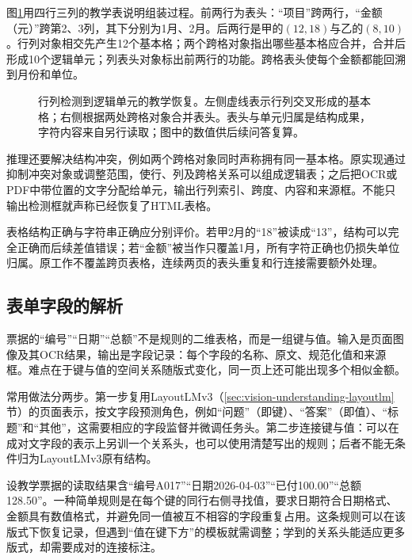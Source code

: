 图\ref{fig:vision-table-structure}用四行三列的教学表说明组装过程。前两行为表头：“项目”跨两行，“金额（元）”跨第2、3列，其下分别为1月、2月。后两行是甲的$(12,18)$与乙的$(8,10)$。行列对象相交先产生12个基本格；两个跨格对象指出哪些基本格应合并，合并后形成10个逻辑单元；列表头对象标出前两行的功能。跨格表头使每个金额都能回溯到月份和单位。

\begin{figure}[tbp]
  \centering
  
  \caption{行列检测到逻辑单元的教学恢复。左侧虚线表示行列交叉形成的基本格；右侧根据两处跨格对象合并表头。表头与单元归属是结构成果，字符内容来自另行读取；图中的数值供后续问答复算。}
  \label{fig:vision-table-structure}
\end{figure}
\FloatBarrier

推理还要解决结构冲突，例如两个跨格对象同时声称拥有同一基本格。原实现通过抑制冲突对象或调整范围，使行、列及跨格关系可以组成逻辑表；之后把OCR或PDF中带位置的文字分配给单元，输出行列索引、跨度、内容和来源框。不能只输出检测框就声称已经恢复了HTML表格。

表格结构正确与字符串正确应分别评价。若甲2月的“18”被读成“13”，结构可以完全正确而后续差值错误；若“金额”被当作只覆盖1月，所有字符正确也仍损失单位归属。原工作不覆盖跨页表格，连续两页的表头重复和行连接需要额外处理。

\subsection{表单字段的解析}
\label{sec:vision-understanding-fields}

票据的“编号”“日期”“总额”不是规则的二维表格，而是一组键与值。输入是页面图像及其OCR结果，输出是字段记录：每个字段的名称、原文、规范化值和来源框。难点在于键与值的空间关系随版式变化，同一页上还可能出现多个相似金额。

常用做法分两步。第一步复用LayoutLMv3（\ref{sec:vision-understanding-layoutlm}节）的页面表示，按文字段预测角色，例如“问题”（即键）、“答案”（即值）、“标题”和“其他”，这需要相应的字段监督并微调任务头。第二步连接键与值：可以在成对文字段的表示上另训一个关系头，也可以使用清楚写出的规则；后者不能无条件归为LayoutLMv3原有结构。

设教学票据的读取结果含“编号A017”“日期2026-04-03”“已付100.00”“总额128.50”。一种简单规则是在每个键的同行右侧寻找值，要求日期符合日期格式、金额具有数值格式，并避免同一值被互不相容的字段重复占用。这条规则可以在该版式下恢复记录，但遇到“值在键下方”的模板就需调整；学到的关系头能适应更多版式，却需要成对的连接标注。

